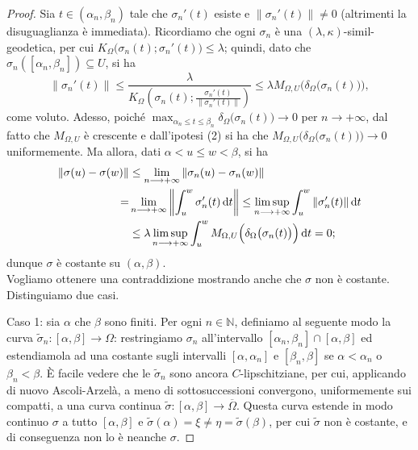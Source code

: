 \begin{proof}
    Sia $t\in(\alpha_n,\beta_n)$ tale che $\sigma_n'(t)$ esiste e $\|\sigma_n'(t)\|\not=0$ (altrimenti la disuguaglianza è immediata). Ricordiamo che ogni $\sigma_n$ è una $(\lambda,\kappa)$-simil-geodetica, per cui $K_\Omega\big(\sigma_n(t);\sigma_n'(t)\big)\le\lambda$; quindi, dato che $\sigma_n([\alpha_n,\beta_n])\subseteq U$, si ha
    $$\|\sigma_n'(t)\|\le \frac{\lambda}{K_\Omega\left(\sigma_n(t);\frac{\sigma_n'(t)}{\|\sigma_n'(t)\|}\right)}\le\lambda M_{\Omega,U}\Big(\delta_\Omega\big(\sigma_n(t)\big)\Big),$$
    come voluto. Adesso, poiché $\displaystyle\max_{\alpha_n\le t\le \beta_n}\delta_\Omega\big(\sigma_n(t)\big)\longrightarrow 0$ per $n\longrightarrow+\infty$, dal fatto che $M_{\Omega,U}$ è crescente e dall'ipotesi (2) si ha che $M_{\Omega,U}\Big(\delta_\Omega\big(\sigma_n(t)\big)\Big)\longrightarrow 0$ uniformemente. Ma allora, dati $\alpha<u\le w<\beta$, si ha
    \begin{align*}
        \|\sigma(u)-\sigma(w)\|&\le \lim_{n\longrightarrow+\infty}\|\sigma_n(u)-\sigma_n(w)\| \\
        =&\lim_{n\longrightarrow+\infty}\left\|\int_u^w\sigma_n'(t)\mathop{}\!\mathrm{d} t\right\|\le \limsup_{n\longrightarrow+\infty} \int_u^w \|\sigma_n'(t)\|\mathop{}\!\mathrm{d} t\\
        &\le \lambda\limsup_{n\longrightarrow+\infty} \int_u^w M_{\Omega,U}\Big(\delta_\Omega\big(\sigma_n(t)\big)\Big)\mathop{}\!\mathrm{d} t=0;
    \end{align*}
    dunque $\sigma$ è costante su $(\alpha,\beta)$. \\

    Vogliamo ottenere una contraddizione mostrando anche che $\sigma$ non è costante. Distinguiamo due casi.

    Caso 1: sia $\alpha$ che $\beta$ sono finiti. Per ogni $n\in\mathbb{N}$, definiamo al seguente modo la curva $\tilde{\sigma}_n:[\alpha,\beta]\longrightarrow\Omega$: restringiamo $\sigma_n$ all'intervallo $[\alpha_n,\beta_n]\cap[\alpha,\beta]$ ed estendiamola ad una costante sugli intervalli $[\alpha,\alpha_n]$ e $[\beta_n,\beta]$ se $\alpha<\alpha_n$ o $\beta_n<\beta$. È facile vedere che le $\tilde{\sigma}_n$ sono ancora $C$-lipschitziane, per cui, applicando di nuovo Ascoli-Arzelà, a meno di sottosuccessioni convergono, uniformemente sui compatti, a una curva continua $\tilde{\sigma}:[\alpha,\beta]\longrightarrow\overline{\Omega}$. Questa curva estende in modo continuo $\sigma$ a tutto $[\alpha,\beta]$ e $\tilde{\sigma}(\alpha)=\xi\not=\eta=\tilde{\sigma}(\beta)$, per cui $\tilde{\sigma}$ non è costante, e di conseguenza non lo è neanche $\sigma$.


\end{proof}
